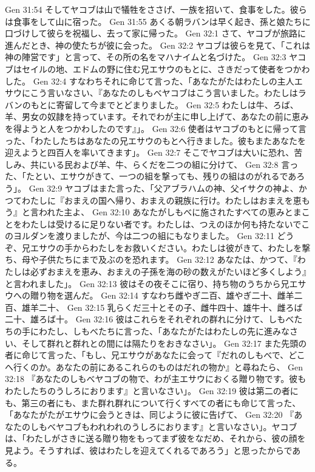 Gen 31:54  そしてヤコブは山で犠牲をささげ、一族を招いて、食事をした。彼らは食事をして山に宿った。
Gen 31:55  あくる朝ラバンは早く起き、孫と娘たちに口づけして彼らを祝福し、去って家に帰った。
Gen 32:1  さて、ヤコブが旅路に進んだとき、神の使たちが彼に会った。
Gen 32:2  ヤコブは彼らを見て、「これは神の陣営です」と言って、その所の名をマハナイムと名づけた。
Gen 32:3  ヤコブはセイルの地、エドムの野に住む兄エサウのもとに、さきだって使者をつかわした。
Gen 32:4  すなわちそれに命じて言った、「あなたがたはわたしの主人エサウにこう言いなさい、『あなたのしもべヤコブはこう言いました。わたしはラバンのもとに寄留して今までとどまりました。
Gen 32:5  わたしは牛、ろば、羊、男女の奴隷を持っています。それでわが主に申し上げて、あなたの前に恵みを得ようと人をつかわしたのです』」。
Gen 32:6  使者はヤコブのもとに帰って言った、「わたしたちはあなたの兄エサウのもとへ行きました。彼もまたあなたを迎えようと四百人を率いてきます」。
Gen 32:7  そこでヤコブは大いに恐れ、苦しみ、共にいる民および羊、牛、らくだを二つの組に分けて、
Gen 32:8  言った、「たとい、エサウがきて、一つの組を撃っても、残りの組はのがれるであろう」。
Gen 32:9  ヤコブはまた言った、「父アブラハムの神、父イサクの神よ、かつてわたしに『おまえの国へ帰り、おまえの親族に行け。わたしはおまえを恵もう』と言われた主よ、
Gen 32:10  あなたがしもべに施されたすべての恵みとまことをわたしは受けるに足りない者です。わたしは、つえのほか何も持たないでこのヨルダンを渡りましたが、今は二つの組にもなりました。
Gen 32:11  どうぞ、兄エサウの手からわたしをお救いください。わたしは彼がきて、わたしを撃ち、母や子供たちにまで及ぶのを恐れます。
Gen 32:12  あなたは、かつて、『わたしは必ずおまえを恵み、おまえの子孫を海の砂の数えがたいほど多くしよう』と言われました」。
Gen 32:13  彼はその夜そこに宿り、持ち物のうちから兄エサウへの贈り物を選んだ。
Gen 32:14  すなわち雌やぎ二百、雄やぎ二十、雌羊二百、雄羊二十、
Gen 32:15  乳らくだ三十とその子、雌牛四十、雄牛十、雌ろば二十、雄ろば十。
Gen 32:16  彼はこれらをそれぞれの群れに分けて、しもべたちの手にわたし、しもべたちに言った、「あなたがたはわたしの先に進みなさい、そして群れと群れとの間には隔たりをおきなさい」。
Gen 32:17  また先頭の者に命じて言った、「もし、兄エサウがあなたに会って『だれのしもべで、どこへ行くのか。あなたの前にあるこれらのものはだれの物か』と尋ねたら、
Gen 32:18  『あなたのしもべヤコブの物で、わが主エサウにおくる贈り物です。彼もわたしたちのうしろにおります』と言いなさい」。
Gen 32:19  彼は第二の者にも、第三の者にも、また群れ群れについて行くすべての者にも命じて言った、「あなたがたがエサウに会うときは、同じように彼に告げて、
Gen 32:20  『あなたのしもべヤコブもわれわれのうしろにおります』と言いなさい」。ヤコブは、「わたしがさきに送る贈り物をもってまず彼をなだめ、それから、彼の顔を見よう。そうすれば、彼はわたしを迎えてくれるであろう」と思ったからである。

